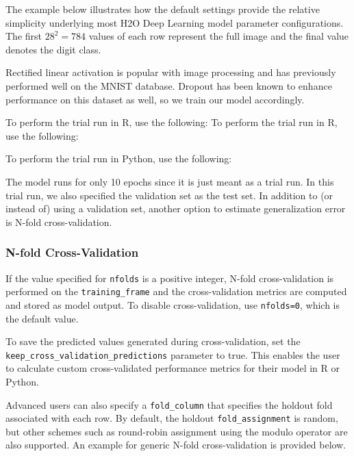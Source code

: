 {{The example below illustrates how the default settings provide the relative simplicity underlying most H2O Deep Learning model parameter configurations. The first $28^2 = 784$ values of each row represent the full image and the final value denotes the digit class. 

Rectified linear activation is popular with image processing and has previously performed well on the MNIST database. Dropout has been known to enhance performance on this dataset as well, so we train our model accordingly. 

\waterExampleInR
To perform the trial run in R, use the following: 
To perform the trial run in R, use the following:


\newpage
\waterExampleInPython
To perform the trial run in Python, use the following: 


\noindent
The model runs for only 10 epochs since it is just meant as a trial run. In this trial run, we also specified the validation set as the test set.  In addition to (or instead of) using a validation set, another option to estimate generalization error is N-fold cross-validation.

\subsubsection{N-fold Cross-Validation} 

If the value specified for \texttt{nfolds} is a positive integer, N-fold cross-validation is performed on the \texttt{training\_frame} and the cross-validation metrics are computed and stored as model output.  To disable cross-validation, use \texttt{nfolds=0}, which is the default value.  

To save the predicted values generated during cross-validation, set the\\ \texttt{keep\_cross\_validation\_predictions} parameter to true.  This enables the user to calculate custom cross-validated performance metrics for their model in R or Python.  

Advanced users can also specify a \texttt{fold\_column} that specifies the holdout fold associated with each row. By default, the holdout \texttt{fold\_assignment} is random, but other schemes such as round-robin assignment using the modulo operator are also supported. An example for generic N-fold cross-validation is provided below.  

}}
